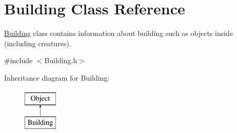 \hypertarget{classBuilding}{\section{Building Class Reference}
\label{classBuilding}
}


\hyperlink{classBuilding}{Building} class contains information about building such as objects inside (including creatures).  




{\ttfamily \#include $<$Building.\-h$>$}

Inheritance diagram for Building\-:\begin{figure}[H]
\begin{center}
\leavevmode
\includegraphics[height=2.000000cm]{classBuilding}
\end{center}
\end{figure}
